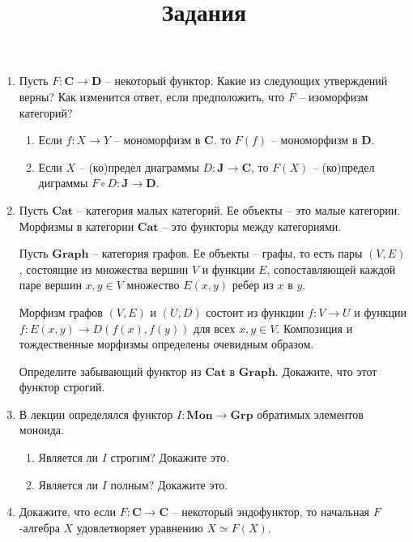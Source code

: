 \documentclass[draft]{article}
\newcommand{\cat}[1]{\mathbf{#1}}
\renewcommand{\C}{\cat{C}}
\newcommand{\D}{\cat{D}}
\newcommand{\Mon}{\cat{Mon}}
\newcommand{\Grp}{\cat{Grp}}
\begin{document}
\title{Задания}
\maketitle

\begin{enumerate}

\item Пусть $F : \C \to \D$ -- некоторый функтор.
Какие из следующих утверждений верны?
Как изменится ответ, если предположить, что $F$ -- изоморфизм категорий?
\begin{enumerate}
\item Если $f : X \to Y$ -- мономорфизм в $\C$. то $F(f)$ -- мономорфизм в $\D$.
\item Если $X$ -- (ко)предел диаграммы $D : \cat{J} \to \C$, то $F(X)$ -- (ко)предел диграммы $F \circ D : \cat{J} \to \D$.
\end{enumerate}

\item Пусть $\cat{Cat}$ -- категория малых категорий.
Ее объекты -- это малые категории.
Морфизмы в категории $\cat{Cat}$ -- это функторы между категориями.

Пусть $\cat{Graph}$ -- категория графов.
Ее объекты -- графы, то есть пары $(V,E)$, состоящие из множества вершин $V$ и функции $E$, сопоставляющей каждой паре вершин $x,y \in V$ множество $E(x,y)$ ребер из $x$ в $y$.

Морфизм графов $(V,E)$ и $(U,D)$ состоит из функции $f : V \to U$ и функции $f : E(x,y) \to D(f(x), f(y))$ для всех $x,y \in V$.
Композиция и тождественные морфизмы определены очевидным образом.

Определите забывающий функтор из $\cat{Cat}$ в $\cat{Graph}$.
Докажите, что этот функтор строгий.

\item В лекции определялся функтор $I : \Mon \to \Grp$ обратимых элементов моноида.
\begin{enumerate}
\item Является ли $I$ строгим? Докажите это.
\item Является ли $I$ полным? Докажите это.
\end{enumerate}

\item Докажите, что если $F : \C \to \C$ -- некоторый эндофунктор, то начальная $F$-алгебра $X$ удовлетворяет уравнению $X \simeq F(X)$.

\end{enumerate}
\end{document}
